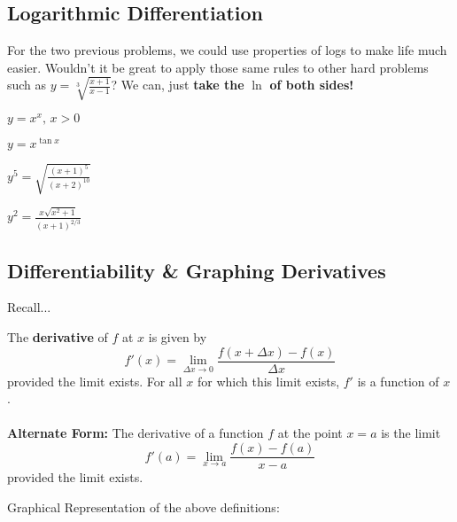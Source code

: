\documentclass[addpoints, 12pt]{exam}
\begin{document}
\subsection*{Logarithmic Differentiation}
For the two previous problems, we could use properties of logs to make life much easier. Wouldn't it be great to apply those same rules to other hard problems such as $\displaystyle y=\sqrt[3]{\frac{x+1}{x-1}}$? We can, just \textbf{take the }$\ln$\textbf{ of both sides!}
\begin{questions}
    \question $\displaystyle y=x^x,\, x>0$
    
    
    \question $y=x^{\tan x}$
    
    
    \question $\displaystyle y^5=\sqrt{\frac{(x+1)^5}{(x+2)^{10}}}$
    
    
    \question $\displaystyle y^2=\frac{x\sqrt{x^2+1}}{(x+1)^{2/3}}$
    
\end{questions}




\newpage
{}
\subsection*{Differentiability \& Graphing Derivatives}
Recall...
\begin{tcolorbox}[title= DEFINITION OF THE DERIVATIVE OF A FUNCTION,colframe=black,sharp corners,colback=white,colbacktitle=white,coltitle=black,boxrule=1pt]

    The \textbf{derivative} of $f$ at $x$ is given by
    \[f'(x)=\lim_{\Delta x\to0}\frac{f(x+\Delta x)-f(x)}{\Delta x}\]
    provided the limit exists. For all $x$ for which this limit exists, $f'$ is a function of $x$.\\
    \\
    \textbf{Alternate Form:} The derivative of a function $f$ at the point $x=a$ is the limit \[f'(a)=\lim_{x\to a}\frac{f(x)-f(a)}{x-a}\]
    provided the limit exists.
    
\end{tcolorbox}
\vspace{.15cm}
Graphical Representation of the above definitions:
\end{document}
